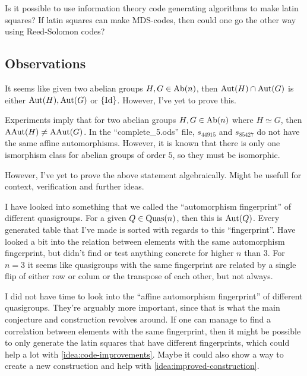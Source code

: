 \begin{idea}
    Is it possible to use information theory code generating algorithms to make latin squares? If latin squares can make MDS-codes, then could one go the other way using Reed-Solomon codes?
\end{idea}

\subsection{Observations}

\begin{idea}
    It seems like given two abelian groups \( H, G \in \operatorname{Ab}(n) \), then \( \operatorname{Aut}(H) \cap \operatorname{Aut}(G) \) is either \( \operatorname{Aut}(H), \operatorname{Aut}(G) \) or \( \left\{ \operatorname{Id} \right\} \). However, I've yet to prove this.
\end{idea}

\begin{idea}
    Experiments imply that for two abelian groups \( H, G \in \operatorname{Ab}(n) \) where \( H \simeq G \), then \( \operatorname{AAut}(H) \neq \operatorname{AAut}(G) \). In the ``complete\_5.ods'' file, \( s_{44915} \) and \( s_{85427} \) do not have the same affine automorphisms. However, it is known that there is only one ismorphism class for abelian groups of order \( 5 \), so they must be isomorphic.

    However, I've yet to prove the above statement algebraically. Might be usefull for context, verification and further ideas.
\end{idea}

\begin{idea} \label{idea:fingerprints}
    I have looked into something that we called the ``automorphism fingerprint'' of different quasigroups. For a given \( Q \in \operatorname{Quas}(n) \), then this is \( \operatorname{Aut}(Q) \). Every generated table that I've made is sorted with regards to this ``fingerprint''. Have looked a bit into the relation between elements with the same automorphism fingerprint, but didn't find or test anything concrete for higher \( n \) than 3. For \( n = 3 \) it seems like quasigroups with the same fingerprint are related by a single flip of either row or colum or the transpose of each other, but not always.

    I did not have time to look into the ``affine automorphism fingerprint'' of different quasigroups. They're arguably more important, since that is what the main conjecture and construction revolves around. If one can manage to find a correlation between elements with the same fingerprint, then it might be possible to only generate the latin squares that have different fingerprints, which could help a lot with \autoref{idea:code-improvements}. Maybe it could also show a way to create a new construction and help with \autoref{idea:improved-construction}.
\end{idea}


